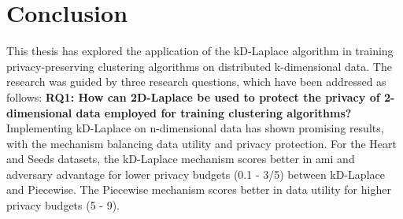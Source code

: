\chapter{Conclusion}
This thesis has explored the application of the kD-Laplace algorithm in training privacy-preserving clustering algorithms on distributed k-dimensional data.
The research was guided by three research questions, which have been addressed as follows: \newline
\textbf{RQ1: How can 2D-Laplace be used to protect the privacy of 2-dimensional data employed for training clustering algorithms?} \newline
Implementing kD-Laplace on n-dimensional data has shown promising results, with the mechanism balancing data utility and privacy protection.
For the Heart and Seeds datasets, the kD-Laplace mechanism scores better in \gls{ami} and adversary advantage for lower privacy budgets (0.1 - 3/5) between kD-Laplace and Piecewise.
The Piecewise mechanism scores better in data utility for higher privacy budgets (5 - 9).


